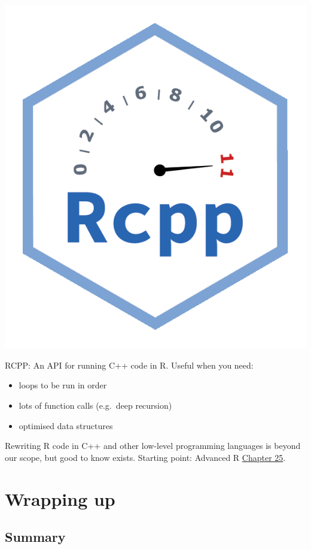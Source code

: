 \documentclass[
  12pt,
]{book}
\providecommand{\tightlist}{%
  \setlength{\itemsep}{0pt}\setlength{\parskip}{0pt}}
\begin{document}
\includegraphics{images/403-production-scalability/Rccp.png}

RCPP: An API for running C++ code in R. Useful when you need:

\begin{itemize}
\tightlist
\item
  loops to be run in order
\item
  lots of function calls (e.g.~deep recursion)
\item
  optimised data structures
\end{itemize}

Rewriting R code in C++ and other low-level programming languages is beyond our scope, but good to know exists. Starting point: Advanced R \href{https://adv-r.hadley.nz/rcpp.html}{Chapter 25}.

\hypertarget{wrapping-up-7}{%
\section{Wrapping up}\label{wrapping-up-7}}

\hypertarget{summary-2}{%
\subsection*{Summary}\label{summary-2}}
\end{document}
